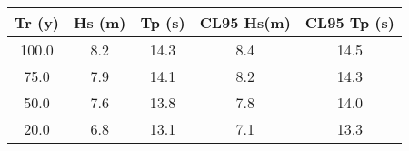 \begin{tabular}{ccccc}
Tr (y)& Hs (m)& Tp (s)& CL95 Hs(m)& CL95 Tp (s) \\\hline
100.0 & 8.2 & 14.3 & 8.4 & 14.5 \\
75.0 & 7.9 & 14.1 & 8.2 & 14.3 \\
50.0 & 7.6 & 13.8 & 7.8 & 14.0 \\
20.0 & 6.8 & 13.1 & 7.1 & 13.3 \\
\hline
\end{tabular}
